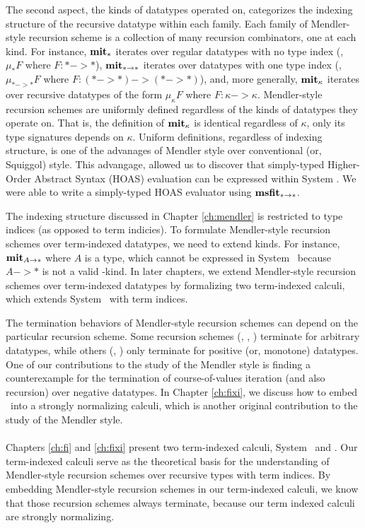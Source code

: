 The second aspect, the kinds of datatypes operated on, categorizes
the indexing structure
of the recursive datatype within each family. Each family of
Mendler-style recursion scheme is a collection of many recursion combinators,
one at each kind. For instance, $\mathbf{mit}_{*}$ iterates over regular datatypes
with no type index (\ie, $\mu_{*}F$ where $F : * -> *$), $\mathbf{mit}_{* -> *}$
iterates over datatypes with one type index (\ie, $\mu_{* -> *} F$ where
$F : (* -> *) -> (* -> *)$), and, more generally, $\mathbf{mit}_{\kappa}$ iterates
over recursive datatypes of the form $\mu_{\kappa}F$ where $F : \kappa -> \kappa$.
Mendler-style recursion schemes are uniformly defined regardless of the kinds
of datatypes they operate on. That is, the definition of $\mathbf{mit}_{\kappa}$ is
identical regardless of $\kappa$, only its type signatures depends on $\kappa$.
Uniform definitions, regardless of indexing structure,
is one of the advanages of Mendler style over conventional (or, Squiggol) style.
This advangage, allowed us to discover that simply-typed Higher-Order
Abstract Syntax (HOAS) evaluation can be expressed within System \Fw.
We were able to write a simply-typed HOAS evaluator using $\mathbf{msfit}_{* -> *}$.

The indexing structure discussed in Chapter \ref{ch:mendler} is restricted
to type indices (as opposed to term indicies). To formulate Mendler-style recursion
schemes over term-indexed datatypes, we need to extend kinds.
For instance, $\mathbf{mit}_{A -> *}$ where $A$ is a type, which cannot
be expressed in System \Fw\ because $A -> *$ is not a valid \Fw-kind.
In later chapters, we extend Mendler-style recursion schemes over
term-indexed datatypes by formalizing two term-indexed calculi, which extends
System \Fw\ with term indices.

The termination behaviors of Mendler-style recursion schemes can depend
on the particular recursion scheme. Some recursion schemes (\MIt, \MPr, \MsfIt) terminate
for arbitrary datatypes, while others (\McvPr, \McvIt) only terminate for
positive (or, monotone) datatypes. One of our contributions to
the study of the Mendler style is finding a counterexample for
the termination of course-of-values iteration (and also recursion) over 
negative datatypes. In Chapter \ref{ch:fixi}, we discuss how to embed
\McvPr\ into a strongly normalizing calculi, which is another original
contribution to the study of the Mendler style.

\paragraph{}
Chapters \ref{ch:fi} and \ref{ch:fixi} present two term-indexed calculi,
System \Fi\ and \Fixi. Our term-indexed calculi serve as the theoretical basis
for the understanding of Mendler-style recursion schemes over recursive types
with term indices. By embedding Mendler-style recursion schemes in
our term-indexed calculi, we know that those recursion schemes always terminate,
because our term indexed calculi are strongly normalizing.

